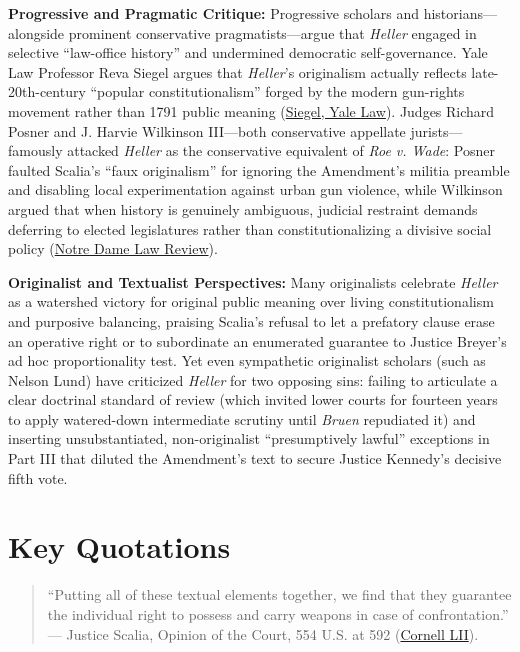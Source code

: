 \documentclass[12pt]{article}
\begin{document}
\textbf{Progressive and Pragmatic Critique:} Progressive scholars and historians---alongside prominent conservative pragmatists---argue that \textit{Heller} engaged in selective ``law-office history'' and undermined democratic self-governance. Yale Law Professor Reva Siegel argues that \textit{Heller}'s originalism actually reflects late-20th-century ``popular constitutionalism'' forged by the modern gun-rights movement rather than 1791 public meaning (\href{https://law.yale.edu/sites/default/files/documents/pdf/Faculty/Siegel_DeadOrAliveOriginalismAsPopularConstitutionalismInHeller.pdf}{Siegel, Yale Law}). Judges Richard Posner and J. Harvie Wilkinson III---both conservative appellate jurists---famously attacked \textit{Heller} as the conservative equivalent of \textit{Roe v. Wade}: Posner faulted Scalia's ``faux originalism'' for ignoring the Amendment's militia preamble and disabling local experimentation against urban gun violence, while Wilkinson argued that when history is genuinely ambiguous, judicial restraint demands deferring to elected legislatures rather than constitutionalizing a divisive social policy (\href{https://scholarship.law.nd.edu/cgi/viewcontent.cgi?article=4582&context=ndlr}{Notre Dame Law Review}).

\textbf{Originalist and Textualist Perspectives:} Many originalists celebrate \textit{Heller} as a watershed victory for original public meaning over living constitutionalism and purposive balancing, praising Scalia's refusal to let a prefatory clause erase an operative right or to subordinate an enumerated guarantee to Justice Breyer's ad hoc proportionality test. Yet even sympathetic originalist scholars (such as Nelson Lund) have criticized \textit{Heller} for two opposing sins: failing to articulate a clear doctrinal standard of review (which invited lower courts for fourteen years to apply watered-down intermediate scrutiny until \textit{Bruen} repudiated it) and inserting unsubstantiated, non-originalist ``presumptively lawful'' exceptions in Part III that diluted the Amendment's text to secure Justice Kennedy's decisive fifth vote.

\section{Key Quotations}
\begin{quote}
``Putting all of these textual elements together, we find that they guarantee the individual right to possess and carry weapons in case of confrontation.'' --- Justice Scalia, Opinion of the Court, 554 U.S. at 592 (\href{https://www.law.cornell.edu/supct/html/07-290.ZO.html}{Cornell LII}).
\end{quote}
\end{document}
